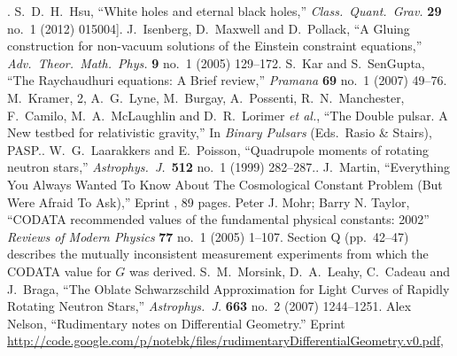 \begin{thebibliography}{99}
  [].
  S.~D.~H.~Hsu,\newblock
  ``White holes and eternal black holes,''\newblock
  \emph{Class.\ Quant.\ Grav.} {\bf 29} no.~1 (2012) 015004\newblock
  [\arXiv[gr-qc]{1007.2934}].
  J.~Isenberg, D.~Maxwell and D.~Pollack,\newblock
  ``A Gluing construction for non-vacuum solutions of the Einstein constraint equations,''\newblock
  \emph{Adv.\ Theor.\ Math.\ Phys.} {\bf 9} no.~1 (2005) 129--172\newblock
  [\arXiv{gr-qc/0501083}].
  S.~Kar and S.~SenGupta,\newblock
  ``The Raychaudhuri equations: A Brief review,''\newblock
  \emph{Pramana} {\bf 69} no.~1 (2007) 49--76\newblock
  [\arXiv{gr-qc/0611123}].
  M.~Kramer, 2, A.~G.~Lyne, M.~Burgay, A.~Possenti, R.~N.~Manchester, F.~Camilo, M.~A.~McLaughlin and D.~R.~Lorimer {\it et al.},\newblock
  ``The Double pulsar. A New testbed for relativistic gravity,''\newblock
  In \emph{Binary Pulsars} (Eds.\ Rasio \& Stairs), PASP..
  W.~G.~Laarakkers and E.~Poisson,\newblock
  ``Quadrupole moments of rotating neutron stars,''\newblock
  \emph{Astrophys.~J.}~{\bf512} no.~1 (1999) 282--287.\newblock
  [\arXiv{gr-qc/9709033}].
  J.~Martin,\newblock
  ``Everything You Always Wanted To Know About The Cosmological Constant Problem (But Were Afraid To Ask),''\newblock
  Eprint , 89 pages.
  Peter J. Mohr; Barry N. Taylor, \newblock
  ``CODATA recommended values of the fundamental physical constants: 2002''\newblock
  \emph{Reviews of Modern Physics} {\bf77} no.~1 (2005) 1--107.\newblock
  Section Q (pp.\ 42--47) describes the mutually inconsistent measurement experiments from which the CODATA value for $G$ was derived.
  S.~M.~Morsink, D.~A.~Leahy, C.~Cadeau and J.~Braga,\newblock
  ``The Oblate Schwarzschild Approximation for Light Curves of Rapidly Rotating Neutron Stars,''\newblock
  \emph{Astrophys.\ J.}  {\bf 663} no.~2 (2007) 1244--1251.
  Alex Nelson,\newblock
  ``Rudimentary notes on Differential Geometry.''\newblock
  Eprint \url{http://code.google.com/p/notebk/files/rudimentaryDifferentialGeometry.v0.pdf},

\end{thebibliography}
